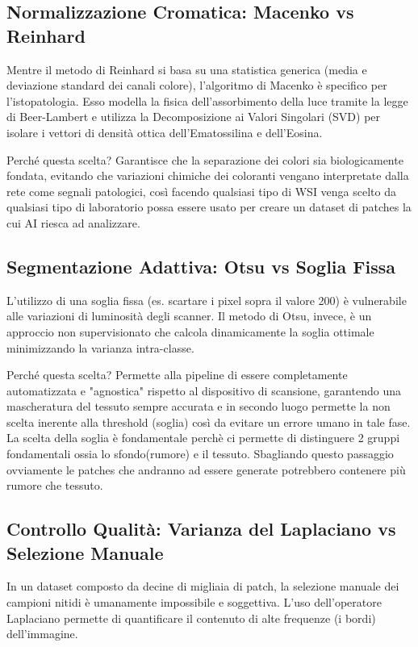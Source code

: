 \subsection{Normalizzazione Cromatica: Macenko vs Reinhard} Mentre il metodo di Reinhard si basa su una statistica generica (media e deviazione standard dei canali colore), l'algoritmo di Macenko è specifico per l'istopatologia. Esso modella la fisica dell'assorbimento della luce tramite la legge di Beer-Lambert e utilizza la Decomposizione ai Valori Singolari (SVD) per isolare i vettori di densità ottica dell'Ematossilina e dell'Eosina.

    Perché questa scelta? Garantisce che la separazione dei colori sia biologicamente fondata, evitando che variazioni chimiche dei coloranti vengano interpretate dalla rete come segnali patologici, così facendo qualsiasi tipo di WSI venga scelto da qualsiasi tipo di laboratorio possa essere usato per creare un dataset di patches la cui AI riesca ad analizzare.

\subsection{Segmentazione Adattiva: Otsu vs Soglia Fissa} L'utilizzo di una soglia fissa (es. scartare i pixel sopra il valore 200) è vulnerabile alle variazioni di luminosità degli scanner. Il metodo di Otsu, invece, è un approccio non supervisionato che calcola dinamicamente la soglia ottimale minimizzando la varianza intra-classe.

    Perché questa scelta? Permette alla pipeline di essere completamente automatizzata e "agnostica" rispetto al dispositivo di scansione, garantendo una mascheratura del tessuto sempre accurata e in secondo luogo permette la non scelta inerente alla threshold (soglia) così da evitare un errore umano in tale fase. La scelta della soglia è fondamentale perchè ci permette di distinguere 2 gruppi fondamentali ossia lo sfondo(rumore) e il tessuto. Sbagliando questo passaggio ovviamente le patches che andranno ad essere generate potrebbero contenere più rumore che tessuto.

\subsection{Controllo Qualità: Varianza del Laplaciano vs Selezione Manuale} In un dataset composto da decine di migliaia di patch, la selezione manuale dei campioni nitidi è umanamente impossibile e soggettiva. L'uso dell'operatore Laplaciano permette di quantificare il contenuto di alte frequenze (i bordi) dell'immagine.

